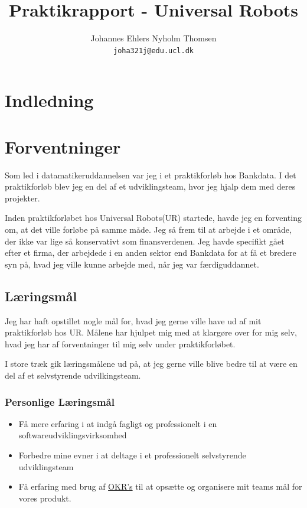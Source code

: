 \documentclass[a4paper]{article}
\title{Praktikrapport - Universal Robots}
\author
{
    Johannes Ehlers Nyholm Thomsen\\ 
    \texttt{joha321j@edu.ucl.dk}
}
\begin{document}
\maketitle

\newpage

\tableofcontents

\newpage

\section{Indledning}

\newpage
\section{Forventninger}
Som led i datamatikeruddannelsen var jeg i et praktikforløb hos Bankdata.
I det praktikforløb blev jeg en del af et udviklingsteam,
hvor jeg hjalp dem med deres projekter.

Inden praktikforløbet hos Universal Robots(UR) startede, havde jeg en forventing om,
at det ville forløbe på samme måde.
Jeg så frem til at arbejde i et område,
der ikke var lige så konservativt som finansverdenen.
Jeg havde specifikt gået efter et firma,
der arbejdede i en anden sektor end Bankdata for at få et bredere syn på,
hvad jeg ville kunne arbejde med, når jeg var færdiguddannet.

\subsection{Læringsmål}
Jeg har haft opstillet nogle mål for, 
hvad jeg gerne ville have ud af mit praktikforløb hos UR.
Målene har hjulpet mig med at klargøre over for mig selv,
hvad jeg har af forventninger til mig selv under praktikforløbet.

I store træk gik læringsmålene ud på, 
at jeg gerne ville blive bedre til at være en del af et selvstyrende
udvilkingsteam.

\subsubsection*{Personlige Læringsmål}
\begin{itemize}
    \item Få mere erfaring i at indgå fagligt og professionelt i en 
    softwareudviklingsvirksomhed
    \item Forbedre mine evner i at deltage i et professionelt selvstyrende 
    udviklingsteam
    \item Få erfaring med brug af \href{https://en.wikipedia.org/wiki/OKR}{OKR's}
     til at opsætte og organisere mit teams mål for vores produkt.
\end{itemize}
\end{document}
